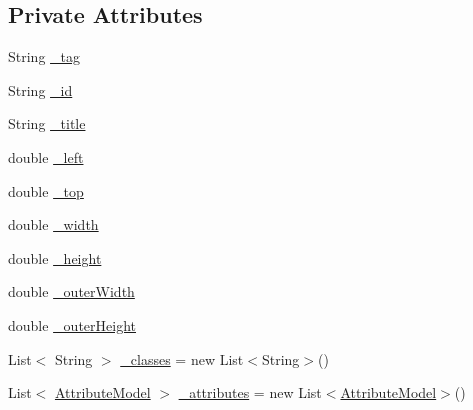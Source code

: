 \subsection*{Private Attributes}
\begin{DoxyCompactItemize}
\item 
String \hyperlink{class_web_analyzer_1_1_models_1_1_data_model_1_1_d_o_m_element_model_a189cb52ec2fbbc5d2fad73187ffa9404}{\+\_\+tag}
\item 
String \hyperlink{class_web_analyzer_1_1_models_1_1_data_model_1_1_d_o_m_element_model_a4f824d5be5dd68766e0a50d5f27a8dfc}{\+\_\+id}
\item 
String \hyperlink{class_web_analyzer_1_1_models_1_1_data_model_1_1_d_o_m_element_model_a1f78ca7c25fcb00ee45f23482ae92c3a}{\+\_\+title}
\item 
double \hyperlink{class_web_analyzer_1_1_models_1_1_data_model_1_1_d_o_m_element_model_aeb026965e7f90ea485c57b8b78d019b0}{\+\_\+left}
\item 
double \hyperlink{class_web_analyzer_1_1_models_1_1_data_model_1_1_d_o_m_element_model_a2375d70647ec50aa1a497e9e9ab6aade}{\+\_\+top}
\item 
double \hyperlink{class_web_analyzer_1_1_models_1_1_data_model_1_1_d_o_m_element_model_ad89c6f97d80115d398e26e76eb2ab7b7}{\+\_\+width}
\item 
double \hyperlink{class_web_analyzer_1_1_models_1_1_data_model_1_1_d_o_m_element_model_a271887d24b632402d029618d0a208cfe}{\+\_\+height}
\item 
double \hyperlink{class_web_analyzer_1_1_models_1_1_data_model_1_1_d_o_m_element_model_a4812f06ca8225b4386f5e5ea45370550}{\+\_\+outer\+Width}
\item 
double \hyperlink{class_web_analyzer_1_1_models_1_1_data_model_1_1_d_o_m_element_model_a4d8c5283f4625e042bb2a98cdec323ce}{\+\_\+outer\+Height}
\item 
List$<$ String $>$ \hyperlink{class_web_analyzer_1_1_models_1_1_data_model_1_1_d_o_m_element_model_a6df986d1bb481e6aba1ab17c5f6c2fce}{\+\_\+classes} = new List$<$String$>$()
\item 
List$<$ \hyperlink{class_web_analyzer_1_1_models_1_1_data_model_1_1_attribute_model}{Attribute\+Model} $>$ \hyperlink{class_web_analyzer_1_1_models_1_1_data_model_1_1_d_o_m_element_model_ac907634afc4fec9be436d2ad08865246}{\+\_\+attributes} = new List$<$\hyperlink{class_web_analyzer_1_1_models_1_1_data_model_1_1_attribute_model}{Attribute\+Model}$>$()
\end{DoxyCompactItemize}


